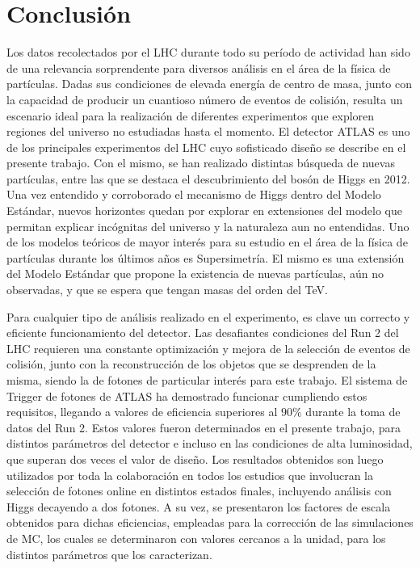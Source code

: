 \chapter{Conclusión}

Los datos recolectados por el LHC durante todo su período de actividad han sido de una relevancia sorprendente para diversos análisis en el área de la física de partículas. Dadas sus condiciones de elevada energía de centro de masa, junto con la capacidad de producir un cuantioso número de eventos de colisión, resulta un escenario ideal para la realización de diferentes experimentos que exploren regiones del universo no estudiadas hasta el momento. El detector ATLAS es uno de los principales experimentos del LHC cuyo sofisticado diseño se describe en el presente trabajo. Con el mismo, se han realizado distintas búsqueda de nuevas partículas, entre las que se destaca el descubrimiento del bosón de Higgs en 2012. Una vez entendido y corroborado el mecanismo de Higgs dentro del Modelo Estándar, nuevos horizontes quedan por explorar en extensiones del modelo que permitan explicar incógnitas del universo y la naturaleza aun no entendidas. Uno de los modelos teóricos de mayor interés para su estudio en el área de la física de partículas durante los últimos años es Supersimetría. El mismo es una extensión del Modelo Estándar que propone la existencia de nuevas partículas, aún no observadas, y que se espera que tengan masas del orden del TeV. 


Para cualquier tipo de análisis realizado en el experimento, es clave un correcto y eficiente funcionamiento del detector. Las desafiantes condiciones del Run 2 del LHC requieren una constante optimización y mejora de la selección de eventos de colisión, junto con la reconstrucción de los objetos que se desprenden de la misma, siendo la de fotones de particular interés para este trabajo.
El sistema de Trigger de fotones de ATLAS ha demostrado funcionar cumpliendo estos requisitos, llegando a valores de eficiencia superiores al $90\%$ durante la toma de datos del Run 2. Estos valores fueron determinados en el presente trabajo, para distintos parámetros del detector e incluso en las condiciones de alta luminosidad, que superan dos veces el valor de diseño. Los resultados obtenidos son luego utilizados por toda la colaboración en todos los estudios que involucran la selección de fotones online en distintos estados finales, incluyendo análisis con Higgs decayendo a dos fotones. A su vez, se presentaron los factores de escala obtenidos para dichas eficiencias, empleadas para la corrección de las simulaciones de MC, los cuales se determinaron con valores cercanos a la unidad, para los distintos parámetros que los caracterizan.

